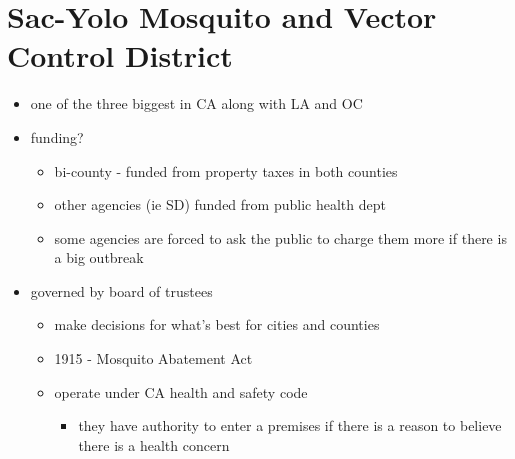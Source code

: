 \documentclass{article}
\begin{document}
    \section{Sac-Yolo Mosquito and Vector Control District}
    \begin{itemize}
        \item one of the three biggest in CA along with LA and OC
        \item funding?
        \begin{itemize}
            \item bi-county - funded from property taxes in both counties
            \item other agencies (ie SD) funded from public health dept
            \item some agencies are forced to ask the public to charge them more if there is a big outbreak
        \end{itemize}
        \item governed by board of trustees
        \begin{itemize}
            \item make decisions for what's best for cities and counties
            \item 1915 - Mosquito Abatement Act
            \item operate under CA health and safety code
            \begin{itemize}
                \item they have authority to enter a premises if there is a reason to believe there is a health concern
            \end{itemize}
        \end{itemize}
    \end{itemize}
\end{document}
